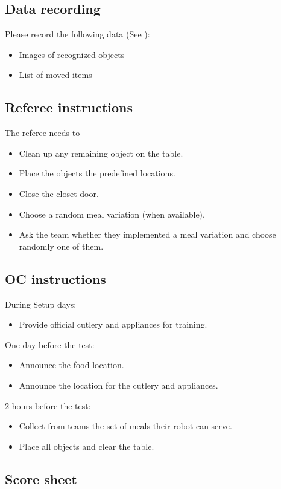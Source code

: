 \subsection{Data recording}
  Please record the following data (See ):
  \begin{itemize}
   \item Images of recognized objects
   \item List of moved items
  \end{itemize}

\subsection{Referee instructions}

The referee needs to
\begin{itemize}
	\item Clean up any remaining object on the table.
	\item Place the objects the predefined locations.
	\item Close the closet door.
	\item Choose a random meal variation (when available).
	\item Ask the team whether they implemented a meal variation and choose randomly one of them.
\end{itemize}

\subsection{OC instructions}
During Setup days:
\begin{itemize}
	\item Provide official cutlery and appliances for training.
\end{itemize}

One day before the test:
\begin{itemize}
	\item Announce the food location.
	\item Announce the location for the cutlery and appliances.
\end{itemize}

2 hours before the test:
\begin{itemize}
	\item Collect from teams the set of meals their robot can serve.
	\item Place all objects and clear the table.
\end{itemize}

\newpage
\subsection{Score sheet}


